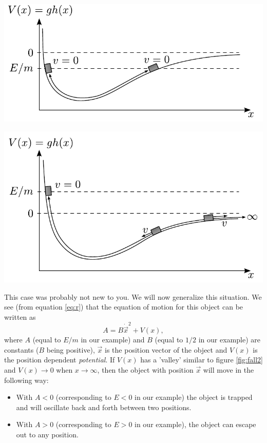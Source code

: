 {\begin{multicols}{2}
\begin{Figure}
\centering
\includegraphics[width=\textwidth]{fig_17-4.pdf}
\end{Figure}
\begin{Figure}
\centering
\includegraphics[width=\textwidth]{fig_17-5.pdf}
\end{Figure}


This case was probably not new to you. We will now generalize this situation. We see (from equation \ref{eq:r}) that the equation of motion for this object can be written as
\begin{equation}
\label{eq:general}
A=B\dot{\vec{x}}^2+V(x),
\end{equation}
where $A$ (equal to $E/m$ in our example) and $B$ (equal to $1/2$ in our example) are constants ($B$ being positive), $\vec{x}$ is the position vector of the object and $V(x)$ is the position dependent {\it potential}. If $V(x)$ has a 'valley' similar to figure \ref{fig:fall2} and $V(x)\rightarrow0$ when $x\rightarrow\infty$, then the object with position $\vec{x}$ will move in the following way:
\begin{itemize}
\item With $A<0$ (corresponding to $E<0$ in our example) the object is trapped and will oscillate back and forth between two positions.
\item With $A>0$ (corresponding to $E>0$ in our example), the object can escape out to any position.
\end{itemize}


\end{multicols}}

